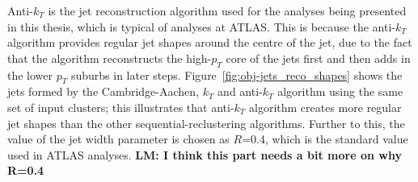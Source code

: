 Anti-$k_T$ is the jet reconstruction algorithm used for the analyses being presented in this thesis, which is typical of analyses at ATLAS.
This is because the anti-$k_T$ algorithm provides regular jet shapes around the centre of the jet,
due to the fact that the algorithm reconstructs the high-$p_T$ core of the jets first and then adds in the lower $p_T$ suburbs in later steps.
Figure~\ref{fig:obj-jets_reco_shapes} shows the jets formed by the Cambridge-Aachen, $k_T$ and anti-$k_T$ algorithm using the same set of input clusters;
this illustrates that anti-$k_T$ algorithm creates more regular jet shapes than the other sequential-reclustering algorithms.
Further to this, the value of the jet width parameter is chosen as $R$=0.4, which is the standard value used in ATLAS analyses.
\textbf{LM: I think this part needs a bit more on why R=0.4}

